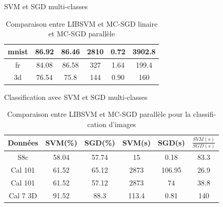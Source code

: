 \documentclass[11pt]{beamer}
\begin{document}
\begin{otherlanguage}{french}
\begin{frame}{SVM et SGD multi-classes}
\begin{table}
\begin{center}
\begin{tabular}{ | c | c | c | c | c | c |}
    mnist & 86.92 & 86.46 & 2810 & 0.72 & 3902.8 \\ \hline
    
    fr & 84.08 & 86.58 & 327 & 1.64 & 199.4 \\ \hline
    
    3d & 76.54 & 75.8 & 144 & 0.90 & 160 \\ \hline
    
    \end{tabular}
\end{center}
\caption{Comparaison entre LIBSVM et MC-SGD linaire et MC-SGD parallèle}
\label{tab:pmcsvm}
\end{table}

\end{frame}



\begin{frame}{Classification avec SVM et SGD multi-classes}

\begin{table}
\begin{center}
    \begin{tabular}{ | c | c | c | c | c | c |}
    \hline
    Données & SVM(\%) & SGD(\%) & SVM(s) & SGD(s) & $\frac{SVM(s)}{SGD(s)}$ \\ \hline
    
    S8c & 58.04 & 57.74 & 15 & 0.18 & 83.3 \\ \hline
    
    Cal 101 & 61.52 & 65.12 & 2873 & 106.95 & 26.9 \\ \hline    
    
    Cal 101 & 61.52 & 57.12 & 2873 & 74 & 38.8 \\ \hline   
    
    Cal 7 3D & 91.52 & 88.3 & 113.4 & 0.81 & 140 \\ \hline    
    
    \end{tabular}
\end{center}
\caption{Comparaison entre LIBSVM et MC-SGD parallèle pour la classification d'images}
\label{tab:pmcsvm-8scenes}
\end{table}

\end{frame}


\end{otherlanguage}
\end{document}
